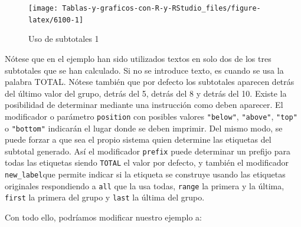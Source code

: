 \documentclass[
]{book}
\begin{document}
\begin{figure}[H]

{\centering \texttt{[image: Tablas-y-graficos-con-R-y-RStudio\_files/figure-latex/6100-1]} 

}

\caption{Uso de subtotales 1}\label{fig:6100}
\end{figure}

Nótese que en el ejemplo han sido utilizados textos en solo dos de los tres subtotales que se han calculado. Si no se introduce texto, es cuando se usa la palabra TOTAL. Nótese también que por defecto los subtotales aparecen detrás del último valor del grupo, detrás del 5, detrás del 8 y detrás del 10. Existe la posibilidad de determinar mediante una instrucción como deben aparecer. El modificador o parámetro \texttt{position} con posibles valores \texttt{"below"}, \texttt{"above"}, \texttt{"top"} o \texttt{"bottom"} indicarán el lugar donde se deben imprimir. Del mismo modo, se puede forzar a que sea el propio sistema quien determine las etiquetas del subtotal generado. Así el modificador \texttt{prefix} puede determinar un prefijo para todas las etiquetas siendo \texttt{TOTAL} el valor por defecto, y también el modificador \texttt{new\_label}que permite indicar si la etiqueta se construye usando las etiquetas originales respondiendo a \texttt{all} que la usa todas, \texttt{range} la primera y la última, \texttt{first} la primera del grupo y \texttt{last} la última del grupo.

Con todo ello, podríamos modificar nuestro ejemplo a:
\end{document}
